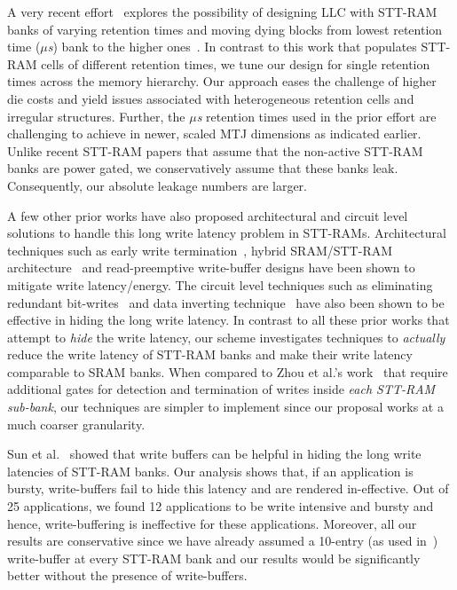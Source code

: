 A very recent effort~\cite{multi-level-retention} explores the possibility of designing LLC 
with STT-RAM banks of varying retention times and moving dying blocks 
from lowest retention time ({\it $\mu$s}) bank to the higher 
ones~\cite{multi-level-retention}. In contrast to this work that 
populates STT-RAM cells of different retention times, we tune our design 
for single retention times across the memory hierarchy. Our approach 
eases the challenge of higher die costs and yield issues associated with 
heterogeneous retention cells and irregular structures. Further, the {\it $\mu$s}
retention times used in the prior effort are challenging to achieve in 
newer, scaled MTJ dimensions as indicated earlier. Unlike recent STT-RAM papers 
that assume that the non-active STT-RAM banks are power gated, we conservatively assume that
these banks leak. Consequently, our absolute leakage numbers are larger.

A few other prior works have also proposed architectural and circuit level
solutions to handle this long write latency problem in STT-RAMs. Architectural techniques such as
early write termination~\cite{mram-energy-reduction}, hybrid SRAM/STT-RAM
architecture~\cite{gsun-hpca, Qureshi:2009:SHPMM} and read-preemptive write-buffer designs have been
shown to mitigate write latency/energy. The circuit level techniques such as eliminating redundant
bit-writes~\cite{mram-energy-reduction} and data inverting technique~\cite{gsun-hpca} have also been
shown to be effective in hiding the long write latency. In contrast to all these prior works that
attempt to {\it hide} the write latency, our scheme investigates techniques to {\it actually} reduce
the write latency of STT-RAM banks and make their write latency comparable to SRAM banks. When
compared to Zhou et al.'s work~\cite{mram-energy-reduction} that require additional gates for
detection and termination of writes inside {\it each STT-RAM sub-bank}, our techniques are simpler to
implement since our proposal works at a much coarser granularity.

Sun et al.~\cite{gsun-hpca} showed that write buffers can be helpful in hiding the long write
latencies of STT-RAM banks. Our analysis shows that, if an application is bursty, write-buffers fail
to hide this latency and are rendered in-effective. Out of 25 applications, we found 12 applications
to be write intensive and bursty and hence, write-buffering is ineffective for these applications.
Moreover, all our results are conservative since we have already assumed a 10-entry (as used
in~\cite{gsun-hpca}) write-buffer at every STT-RAM bank and our results would be significantly better
without the presence of write-buffers.

